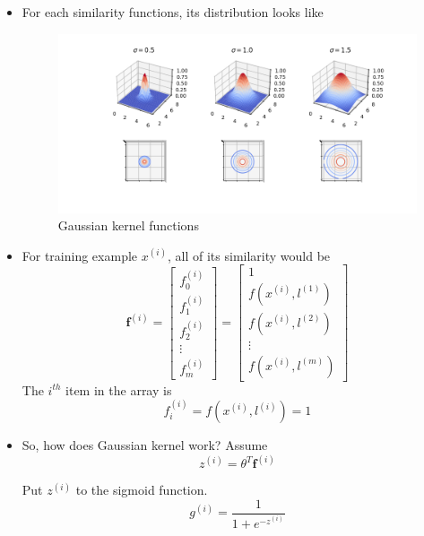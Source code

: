 \begin{itemize}
\item For each similarity functions, its distribution looks like
\begin{figure}[!htbp]
    \centering
    \includegraphics[width=7.0in]{./images/gaussianKernel.png}
    \caption{Gaussian kernel functions}
\end{figure}

\item For training example $x^{(i)}$, all of its similarity would be
\begin{equation}
    \mathbf{f}^{(i)} = \left[\begin{matrix}
        f_0^{(i)} \\ f_1^{(i)} \\ f_2^{(i)} \\ \vdots \\ f_m^{(i)}
    \end{matrix}\right] = 
    \left[\begin{matrix}
        1 \\ f(x^{(i)}, l^{(1)}) \\ f(x^{(i)}, l^{(2)}) \\ \vdots \\ f(x^{(i)}, l^{(m)})
    \end{matrix}\right]
\end{equation}
The $i^{th}$ item in the array is
\begin{equation}
    f_i^{(i)} = f(x^{(i)}, l^{(i)}) = 1
\end{equation}

\item So, how does Gaussian kernel work? Assume
\begin{equation}
    z^{(i)} = \theta^T\mathbf{f}^{(i)}
\end{equation}

Put $z^{(i)}$ to the sigmoid function.
\begin{equation}
    g^{(i)} = \frac{1}{1+e^{-z^{(i)}}}
\end{equation}


\end{itemize}
